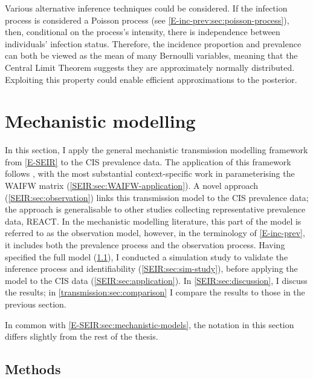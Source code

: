 \documentclass[thesis.tex]{subfiles}
\begin{document}
Various alternative inference techniques could be considered.
If the infection process is considered a Poisson process (see \cref{E-inc-prev:sec:poisson-process}), then, conditional on the process's intensity, there is independence between individuals' infection status.
Therefore, the incidence proportion and prevalence can both be viewed as the mean of many Bernoulli variables, meaning that the Central Limit Theorem suggests they are approximately normally distributed.
Exploiting this property could enable efficient approximations to the posterior.


\section{Mechanistic modelling} \label{SEIR}

In this section, I apply the general mechanistic transmission modelling framework from \cref{E-SEIR} to the CIS prevalence data.
The application of this framework follows \textcite{birrellRealtime}, with the most substantial context-specific work in parameterising the WAIFW matrix (\cref{SEIR:sec:WAIFW-application}).
A novel approach (\cref{SEIR:sec:observation}) links this transmission model to the CIS prevalence data; the approach is generalisable to other studies collecting representative prevalence data, \eg REACT.
In the mechanistic modelling literature, this part of the model is referred to as the observation model, however, in the terminology of \cref{E-inc-prev}, it includes both the prevalence process and the observation process.
Having specified the full model (\cref{SEIR:sec:methods-application}), I conducted a simulation study to validate the inference process and identifiability (\cref{SEIR:sec:sim-study}), before applying the model to the CIS data (\cref{SEIR:sec:application}).
In \cref{SEIR:sec:discussion}, I discuss the results; in \cref{transmission:sec:comparison} I compare the results to those in the previous section.

In common with \cref{E-SEIR:sec:mechanistic-models}, the notation in this section differs slightly from the rest of the thesis.

\subsection{Methods} \label{SEIR:sec:methods-application}
\end{document}
